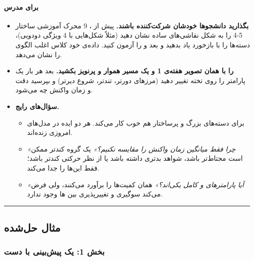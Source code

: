 \paragraph{برای مدرس}

\begin{itemize}
\tightlist
\item
  \textbf{بگذارید دانشجوها خودشان شرکت‌کننده باشند.} پیش از ، 9
  محرک آموزشی ساختار 5-4 را به شکل نقاشی‌های ساده نشان دهید (مثلاً شکل‌هایی
  با 4 ویژگی دودویی)، دسته‌ها را با بازخورد یاد بدهید و بعد  و
   را آزمون کنید. داده‌ی خود کلاس اغلب الگوی  را نشان
  می‌دهد.
\item
  \textbf{ را با همان تصویر هفته‌ی 1 و یک مسیر هموار و پرنویز
  بکشید.} بعد هر بار یک پارامتر را روی تخته تغییر دهید (مرزهای دورتر،
   تندتر، شروع دیرتر) و بپرسید دقت و زمان واکنش چه می‌شود.
\item
  \textbf{سؤال‌های رایج.}

  \begin{itemize}
  \tightlist
  \item
    برای دسته‌های بزرگ و پرساختار  هم خوب کار می‌کند. هر دو
    ایده در مدل‌های امروزی زنده‌اند.
  \item
    \emph{«چرا فقط میانگین زمان واکنش را مقایسه نکنیم؟»} یک گروه کندتر
    ممکن است محتاط‌تر باشد، شواهد بدتری داشته باشد یا از نظر حرکتی کندتر
    باشد؛ فقط  این‌ها را جدا می‌کند.
  \item
    \emph{«آیا پارامترهای  و  کامل یکی‌اند؟»} همان کمیت‌ها
    را برآورد می‌کنند، ولی  فرض می‌کند سوگیری و تغییرپذیری بین
    ها وجود ندارد.
  \end{itemize}
\end{itemize}

\begin{center}\rule{0.5\linewidth}{0.5pt}\end{center}


\subsection{مثال حل‌شده}

\subsubsection{\texorpdfstring{بخش 1: یک پیش‌بینی  با
دست}{بخش 1: یک پیش‌بینی GCM با دست}}

